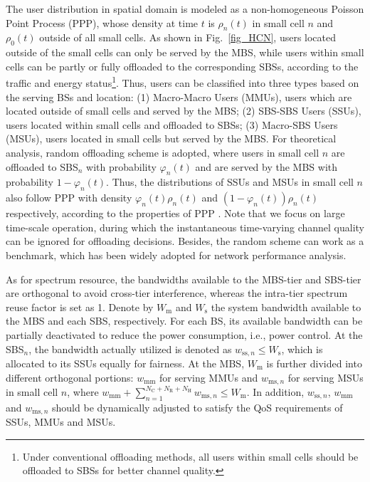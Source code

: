 \documentclass[12pt, draftclsnofoot,onecolumn]{IEEEtran}
\begin{document}
The user distribution in spatial domain is modeled as a non-homogeneous Poisson Point Process (PPP), whose density at time $t$ is $\rho_{n}(t)$ in small cell $n$ and $\rho_0(t)$ outside of all small cells.
As shown in Fig.~\ref{fig_HCN}, users located outside of the small cells can only be served by the MBS, while users within small cells can be partly or fully offloaded to the corresponding SBSs, according to the traffic and energy status\footnote{Under conventional offloading methods, all users within small cells should be offloaded to SBSs for better channel quality.}.
Thus, users can be classified into three types based on the serving BSs and location: (1) Macro-Macro Users (MMUs), users which are located outside of small cells and served by the MBS; (2) SBS-SBS Users (SSUs), users located within small cells and offloaded to SBSs; (3) Macro-SBS Users (MSUs), users located in small cells but served by the MBS.
For theoretical analysis, random offloading scheme is adopted, where users in small cell $n$ are offloaded to SBS$_n$ with probability $\varphi_n(t)$ and are served by the MBS with probability $1-\varphi_n(t)$.
Thus, the distributions of SSUs and MSUs in small cell $n$ also follow PPP with density $\varphi_n(t) \rho_{n}(t)$ and $(1-\varphi_n(t)) \rho_{n}(t)$ respectively, according to the properties of PPP \cite{Stochastic_Geometry}.
Note that we focus on large time-scale operation, during which the instantaneous time-varying channel quality can be ignored for offloading decisions.
Besides, the random scheme can work as a benchmark, which has been widely adopted for network performance analysis.

As for spectrum resource, the bandwidths available to the MBS-tier and SBS-tier are orthogonal to avoid cross-tier interference, whereas the intra-tier spectrum reuse factor is set as 1.
Denote by $W_\mathrm{m}$ and $W_\mathrm{s}$ the system bandwidth available to the MBS and each SBS, respectively.
For each BS, its available bandwidth can be partially deactivated to reduce the power consumption, i.e., power control.
At the SBS$_n$, the bandwidth actually utilized is denoted as $w_{\mathrm{ss},n}\leq W_\mathrm{s}$, which is allocated to its SSUs equally for fairness.
At the MBS, $W_\mathrm{m}$ is further divided into different orthogonal portions: $w_\mathrm{mm}$ for serving MMUs and $w_{\mathrm{ms},n}$ for serving MSUs in small cell $n$, where $w_\mathrm{mm} + \sum_{n=1}^{N_\mathrm{C}+N_\mathrm{R}+N_\mathrm{H}} w_{\mathrm{ms},n} \leq W_\mathrm{m}$.
In addition, $w_{\mathrm{ss},n}$, $w_\mathrm{mm}$ and $w_{\mathrm{ms},n}$ should be dynamically adjusted to satisfy the QoS requirements of SSUs, MMUs and MSUs.
\end{document}
